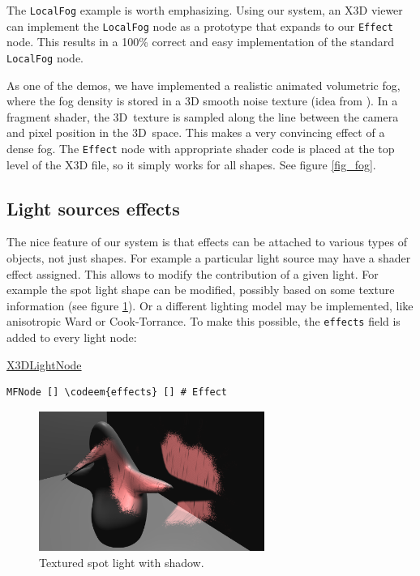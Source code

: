 \documentclass{egpubl}
\newenvironment{mycode}
{\begin{mycodecore}}
{\end{mycodecore}
\vspace{-0.1in}}
\newcommand*{\codeem}[1]{\textbf{#1}}
\begin{document}
The \texttt{LocalFog} example is worth emphasizing. Using our system,
an X3D viewer can implement the \texttt{LocalFog} node as a prototype
that expands to our \texttt{Effect} node. This results in a 100\% correct
and easy implementation of the standard \texttt{LocalFog} node.

As one of the demos, we have implemented a realistic
animated volumetric fog, where the fog density is stored in
a 3D smooth noise texture (idea from \cite{humus:volumetricfog}).
In a fragment shader, the 3D~texture is sampled
along the line between the camera and pixel position in the 3D~space. This makes a very
convincing effect of a dense fog. The \texttt{Effect} node with
appropriate shader code is placed at the top level of the X3D file,
so it simply works for all shapes. See figure \ref{fig_fog}.

\subsection{Light sources effects}

The nice feature of our system is that effects can be attached to various
types of objects, not just shapes. For example a particular light source
may have a shader effect assigned.
This allows to modify the contribution of a given light.
For example the spot light shape can be modified, possibly
based on some texture information (see figure \ref{fig_fancy_spot}).
Or a different lighting model may be implemented, like anisotropic Ward
or Cook-Torrance.
To make this possible, the \texttt{effects} field is added to every light node:

\begin{mycode}
\underline{X3DLightNode}
\begin{Verbatim}[commandchars=\\\{\},fontsize=\small]
MFNode [] \codeem{effects} [] # Effect
\end{Verbatim}
\end{mycode}

\begin{figure}[H]
  \centering
  \includegraphics[width=2.9in]{fancy_light_spot_shape-cropped}
  \caption{Textured spot light with shadow.}
  \label{fig_fancy_spot}
\end{figure}
\end{document}
